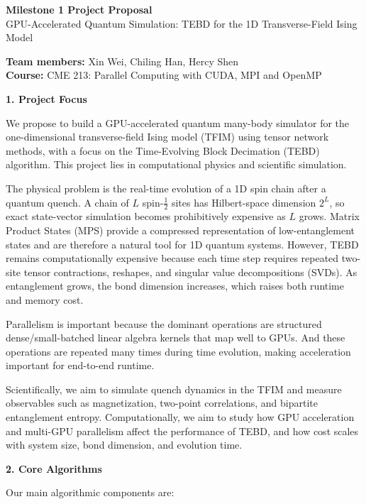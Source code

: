 \documentclass[11pt]{article}
\begin{document}
\begin{center}
{\Large \textbf{Milestone 1 Project Proposal}}\\[0.4em]
{\large GPU-Accelerated Quantum Simulation: TEBD for the 1D Transverse-Field Ising Model}
\end{center}

\textbf{Team members:} Xin Wei, Chiling Han, Hercy Shen\\
\textbf{Course:} CME 213: Parallel Computing with CUDA, MPI and OpenMP

\vspace{0.5em}

\textbf{1. Project Focus}

We propose to build a GPU-accelerated quantum many-body simulator for the one-dimensional transverse-field Ising model (TFIM) using tensor network methods, with a focus on the Time-Evolving Block Decimation (TEBD) algorithm. This project lies in computational physics and scientific simulation.

The physical problem is the real-time evolution of a 1D spin chain after a quantum quench. A chain of $L$ spin-$\tfrac12$ sites has Hilbert-space dimension $2^L$, so exact state-vector simulation becomes prohibitively expensive as $L$ grows. Matrix Product States (MPS) provide a compressed representation of low-entanglement states and are therefore a natural tool for 1D quantum systems. However, TEBD remains computationally expensive because each time step requires repeated two-site tensor contractions, reshapes, and singular value decompositions (SVDs). As entanglement grows, the bond dimension increases, which raises both runtime and memory cost.

Parallelism is important because the dominant operations are structured dense/small-batched linear algebra kernels that map well to GPUs. And these operations are repeated many times during time evolution, making acceleration important for end-to-end runtime.

Scientifically, we aim to simulate quench dynamics in the TFIM and measure observables such as magnetization, two-point correlations, and bipartite entanglement entropy. Computationally, we aim to study how GPU acceleration and multi-GPU parallelism affect the performance of TEBD, and how cost scales with system size, bond dimension, and evolution time.

\vspace{0.4em}
\textbf{2. Core Algorithms}

Our main algorithmic components are:
\end{document}
